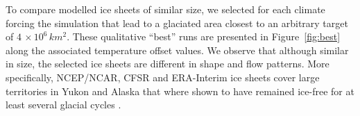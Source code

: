To compare modelled ice sheets of similar size, we selected for each climate forcing the simulation that lead to a glaciated area closest to an arbitrary target of $4\,\times10^6\,\unit{km^2}$. These qualitative ``best'' runs are presented in Figure~\ref{fig:best} along the associated temperature offset values. We observe that although similar in size, the selected ice sheets are different in shape and flow patterns. More specifically, NCEP/NCAR, CFSR and ERA-Interim ice sheets cover large territories in Yukon and Alaska that where shown to have remained ice-free for at least several glacial cycles \citep{dukrodkin-1999,kaufman-manley-2004}.

